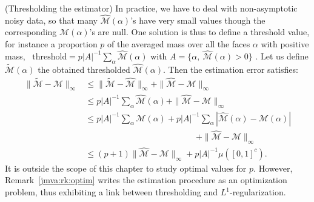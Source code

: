 \begin{remark}{{(\sc Thresholding the estimator})}
\label{jmva:rk:threshold}
In practice, we have to deal with non-asymptotic noisy data, so that many $\widehat{\mathcal{M}}(\alpha)$'s have very small values though the corresponding $\mathcal{M}(\alpha)$'s are null.
One solution is thus to define a threshold value, for instance a proportion $p$ of the averaged mass over all the faces $\alpha$ with positive mass, \ie~$\text{threshold} = p |A|^{-1} \sum_{\alpha} \widehat{\mathcal{M}}(\alpha)$ with $A = \{\alpha,~\widehat{\mathcal{M}}(\alpha) > 0\}$ .
Let us define $\widetilde{\mathcal{M}}(\alpha)$ the obtained thresholded $\widehat{\mathcal{M}}(\alpha)$. Then the estimation error satisfies:
\begin{align*}
\|\widetilde{\mathcal{M}} - \mathcal{M}\|_\infty &\le \| \widetilde{\mathcal{M}} - \widehat{\mathcal{M}} \|_\infty +  \| \widehat{\mathcal{M}} - \mathcal{M}\|_\infty \\
& \le p |A|^{-1} \sum_{\alpha} \widehat{\mathcal{M}}(\alpha) + \| \widehat{\mathcal{M}} - \mathcal{M} \|_\infty \\
& \le p |A|^{-1} \sum_{\alpha} \mathcal{M}(\alpha) + p |A|^{-1} \sum_{\alpha} |  \widehat{\mathcal{M}}(\alpha) - \mathcal{M}(\alpha) | \\&~~~~~~~~~~~~~~~~~~~~~~~~~~~~~~~~~~~~~~~~~~~~~~~~~~~~~~~~~~~+ \| \widehat{\mathcal{M}} - \mathcal{M} \|_\infty \\
& \le (p + 1) \| \widehat{\mathcal{M}} - \mathcal{M} \|_\infty + p |A|^{-1} \mu([0, 1]^c).
\end{align*}
It is outside the scope of this chapter to study optimal values for $p$. However, Remark~\ref{jmva:rk:optim} writes the estimation procedure as an optimization problem, thus exhibiting a link between thresholding and $L^1$-regularization.
\end{remark}

